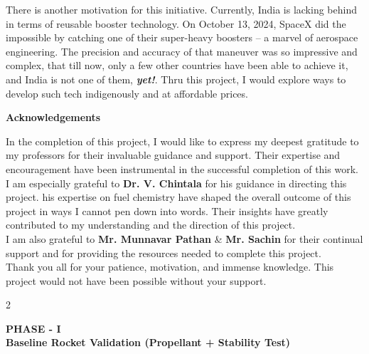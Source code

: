 \documentclass[10pt]{report}
\begin{document}
  There is another motivation for this initiative. Currently, India is lacking behind in terms of reusable booster technology. On October 13, 2024, SpaceX did the impossible by catching one of their super-heavy boosters -- a marvel of aerospace engineering. The precision and accuracy of that maneuver was so impressive and complex, that till now, only a few other countries have been able to achieve it, and India is not one of them, \textbf{\textit{yet!}}. Thru this project, I would explore ways to develop such tech indigenously and at affordable prices.

  \newpage 
  \begin{center}
    \textbf{\LARGE Acknowledgements}
  \end{center}

    In the completion of this project, I would like to express my deepest gratitude to my professors for their invaluable guidance and support. Their expertise and encouragement have been instrumental in the successful completion of this work. \\

I am especially grateful to \textbf{Dr. V. Chintala} for his guidance in directing this project. his expertise on fuel chemistry have shaped the overall outcome of this project in ways I cannot pen down into words. Their insights have greatly contributed to my understanding and the direction of this project. \\

I am also grateful to \textbf{Mr. Munnavar Pathan} \& \textbf{Mr. Sachin} for their continual support and for providing the resources needed to complete this project.  \\

Thank you all for your patience, motivation, and immense knowledge. This project would not have been possible without your support.
  
  \begin{spacing}{2}
    \tableofcontents
  \end{spacing}

  \newpage
\begin{center}
    \textbf{\LARGE PHASE - I} \\
    \vspace{0.2cm}
    \textbf{\Large Baseline Rocket Validation (Propellant + Stability Test)}
  \end{center}
\end{document}
